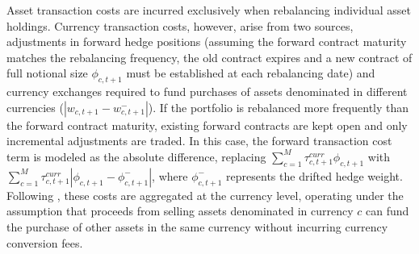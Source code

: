 Asset transaction costs are incurred exclusively when rebalancing individual asset holdings. Currency transaction costs, however, arise from two sources, adjustments in forward hedge positions (assuming the forward contract maturity matches the rebalancing frequency, the old contract expires and a new contract of full notional size $\phi_{c,t+1}$ must be established at each rebalancing date) and currency exchanges required to fund purchases of assets denominated in different currencies ($|w_{c,t+1} - w^{-}_{c,t+1}|$). If the portfolio is rebalanced more frequently than the forward contract maturity, existing forward contracts are kept open and only incremental adjustments are traded. In this case, the forward transaction cost term is modeled as the absolute difference, replacing $\sum_{c=1}^{M} \tau^{curr}_{c,t+1} \phi_{c,t+1}$ with $\sum_{c=1}^{M} \tau^{curr}_{c,t+1} |\phi_{c,t+1} - \phi^{-}_{c,t+1}|$, where $\phi^{-}_{c,t+1}$ represents the drifted hedge weight. Following \cite{SparseAndStableInternationalPortfolioOptimization}, these costs are aggregated at the currency level, operating under the assumption that proceeds from selling assets denominated in currency $c$ can fund the purchase of other assets in the same currency without incurring currency conversion fees.

